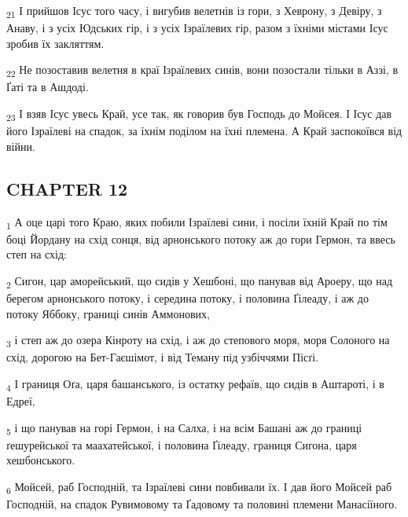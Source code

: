 \begin{tcolorbox}
\textsubscript{21} І прийшов Ісус того часу, і вигубив велетнів із гори, з Хеврону, з Девіру, з Анаву, і з усіх Юдських гір, і з усіх Ізраїлевих гір, разом з їхніми містами Ісус зробив їх закляттям.
\end{tcolorbox}
\begin{tcolorbox}
\textsubscript{22} Не позоставив велетня в краї Ізраїлевих синів, вони позостали тільки в Аззі, в Ґаті та в Ашдоді.
\end{tcolorbox}
\begin{tcolorbox}
\textsubscript{23} І взяв Ісус увесь Край, усе так, як говорив був Господь до Мойсея. І Ісус дав його Ізраїлеві на спадок, за їхнім поділом на їхні племена. А Край заспокоївся від війни.
\end{tcolorbox}
\subsection{CHAPTER 12}
\begin{tcolorbox}
\textsubscript{1} А оце царі того Краю, яких побили Ізраїлеві сини, і посіли їхній Край по тім боці Йордану на схід сонця, від арнонського потоку аж до гори Гермон, та ввесь степ на схід:
\end{tcolorbox}
\begin{tcolorbox}
\textsubscript{2} Сигон, цар аморейський, що сидів у Хешбоні, що панував від Ароеру, що над берегом арнонського потоку, і середина потоку, і половина Ґілеаду, і аж до потоку Яббоку, границі синів Аммонових,
\end{tcolorbox}
\begin{tcolorbox}
\textsubscript{3} і степ аж до озера Кінроту на схід, і аж до степового моря, моря Солоного на схід, дорогою на Бет-Гаєшімот, і від Теману під узбіччями Пісґі.
\end{tcolorbox}
\begin{tcolorbox}
\textsubscript{4} І границя Оґа, царя башанського, із остатку рефаїв, що сидів в Аштароті, і в Едреї,
\end{tcolorbox}
\begin{tcolorbox}
\textsubscript{5} і що панував на горі Гермон, і на Салха, і на всім Башані аж до границі ґешурейської та маахатейської, і половина Ґілеаду, границя Сигона, царя хешбонського.
\end{tcolorbox}
\begin{tcolorbox}
\textsubscript{6} Мойсей, раб Господній, та Ізраїлеві сини повбивали їх. І дав його Мойсей раб Господній, на спадок Рувимовому та Ґадовому та половині племени Манасіїного.
\end{tcolorbox}

